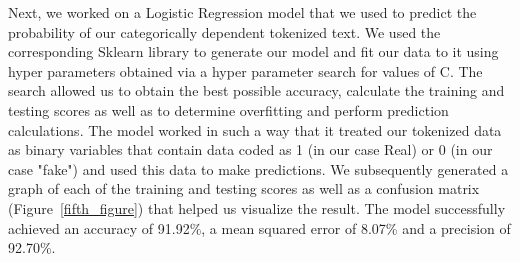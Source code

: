 \documentclass[10pt,twocolumn,letterpaper]{article}
\begin{document}
Next, we worked on a Logistic Regression model that we used to predict the probability of our categorically dependent tokenized text. We used the corresponding Sklearn library to generate our model and fit our data to it using hyper parameters obtained via a hyper parameter search for values of C. The search allowed us to obtain the best possible accuracy, calculate the training and testing scores as well as to determine overfitting and perform prediction calculations. The model worked in such a way that it treated our tokenized data as binary variables that contain data coded as 1 (in our case Real) or 0 (in our case "fake") and used this data to make predictions. We subsequently generated a graph of each of the training and testing scores as well as a confusion matrix (Figure~\ref{fifth_figure}) that helped us visualize the result. The model successfully achieved an accuracy of 91.92\%, a mean squared error of 8.07\% and a precision of 92.70\%. \\
\end{document}
